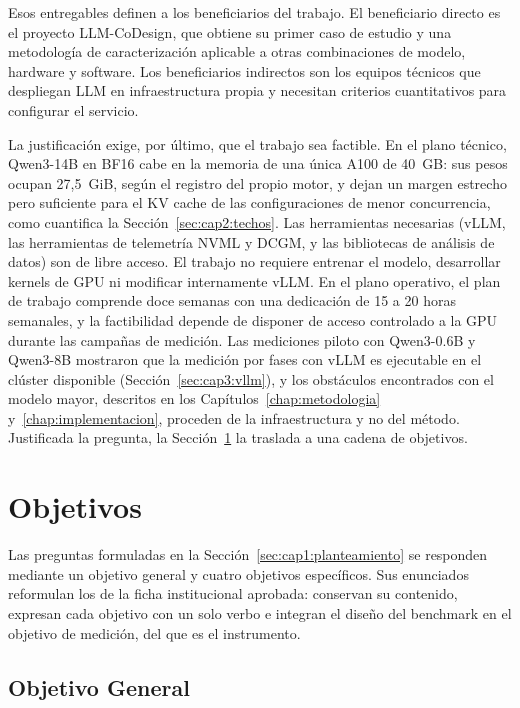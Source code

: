 Esos entregables definen a los beneficiarios del trabajo. El beneficiario directo es el proyecto LLM-CoDesign, que obtiene su primer caso de estudio y una metodología de caracterización aplicable a otras combinaciones de modelo, hardware y software. Los beneficiarios indirectos son los equipos técnicos que despliegan LLM en infraestructura propia y necesitan criterios cuantitativos para configurar el servicio.

La justificación exige, por último, que el trabajo sea factible. En el plano técnico, Qwen3-14B en BF16 cabe en la memoria de una única A100 de 40~GB: sus pesos ocupan 27,5~GiB, según el registro del propio motor, y dejan un margen estrecho pero suficiente para el KV cache de las configuraciones de menor concurrencia, como cuantifica la Sección~\ref{sec:cap2:techos}. Las herramientas necesarias (vLLM, las herramientas de telemetría NVML y DCGM, y las bibliotecas de análisis de datos) son de libre acceso. El trabajo no requiere entrenar el modelo, desarrollar kernels de GPU ni modificar internamente vLLM. En el plano operativo, el plan de trabajo comprende doce semanas con una dedicación de 15 a 20 horas semanales, y la factibilidad depende de disponer de acceso controlado a la GPU durante las campañas de medición. Las mediciones piloto con Qwen3-0.6B y Qwen3-8B mostraron que la medición por fases con vLLM es ejecutable en el clúster disponible (Sección~\ref{sec:cap3:vllm}), y los obstáculos encontrados con el modelo mayor, descritos en los Capítulos~\ref{chap:metodologia} y~\ref{chap:implementacion}, proceden de la infraestructura y no del método. Justificada la pregunta, la Sección~\ref{sec:cap1:objetivos} la traslada a una cadena de objetivos.

\section{Objetivos}
\label{sec:cap1:objetivos}

Las preguntas formuladas en la Sección~\ref{sec:cap1:planteamiento} se responden mediante un objetivo general y cuatro objetivos específicos. Sus enunciados reformulan los de la ficha institucional aprobada: conservan su contenido, expresan cada objetivo con un solo verbo e integran el diseño del benchmark en el objetivo de medición, del que es el instrumento.

\subsection{Objetivo General}
\label{sec:cap1:objetivo-general}

